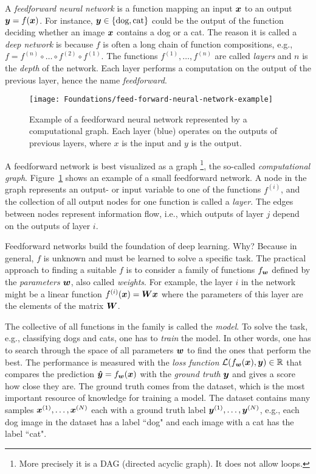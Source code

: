 		A \emph{feedforward neural network} is a function mapping an input $\bm{x}$ to an output $\bm{y} = f(\bm{x})$.
		For instance, $\bm{y} \in \{\text{dog}, \text{cat} \}$ could be the output of the function deciding whether an image $\bm{x}$ contains a dog or a cat. 
		The reason it is called a \emph{deep network} is because $f$ is often a long chain of function compositions, e.g., 
		$f = f^{(n)} \circ  \ldots  \circ f^{(2)} \circ f^{(1)}$.
		The functions $f^{(1)}, \dots, f^{(n)}$ are called \emph{layers} and $n$ is the \emph{depth} of the network.
		Each layer performs a computation on the output of the previous layer, hence the name \emph{feedforward}.
		\begin{figure}[t]
			\centering
			\texttt{[image: Foundations/feed-forward-neural-network-example]}
			\caption[Example of a feedforward neural network]
					{Example of a feedforward neural network represented by a computational graph. 
					 Each layer (blue) operates on the outputs of previous layers, where $x$ is the input and $y$ is the output.
					 \label{fig:example_feed_forward_network}}
		\end{figure}
		A feedforward network is best visualized as a graph%
		\footnote{More precisely it is a DAG (directed acyclic graph). It does not allow loops.}, 
		the so-called \emph{computational graph}.
		Figure~\ref{fig:example_feed_forward_network} shows an example of a small feedforward network.
		A node in the graph represents an output- or input variable to one of the functions $f^{(i)}$, and the collection of all output nodes for one function is called a \emph{layer}. 
		The edges between nodes represent information flow, i.e., which outputs of layer $j$ depend on the outputs of layer $i$.
		
		Feedforward networks build the foundation of deep learning.
		Why?
		Because in general, $f$ is unknown and must be learned to solve a specific task.
		The practical approach to finding a suitable $f$ is to consider a family of functions $f_{\bm{w}}$ defined by the \emph{parameters} $\bm{w}$, also called \emph{weights}.
		For example, the layer $i$ in the network might be a linear function $f_{}^{(i)}(\bm{x}) = \bm{W} \bm{x}$ where the parameters of this layer are the elements of the matrix $\bm{W}$.
		
		The collective of all functions in the family is called the \emph{model}.
		To solve the task, e.g., classifying dogs and cats, one has to \emph{train} the model.
		In other words, one has to search through the space of all parameters $\bm{w}$ to find the ones that perform the best.
		The performance is measured with the \emph{loss function} 
		$\mathcal{L}(f_{\bm{w}}(\bm{x}), \bm{y}) \in \mathbb{R}$ that compares the prediction 
		$\bm{\hat{y}} = f_{\bm{w}}(\bm{x})$ with the \emph{ground truth} $\bm{y}$ and gives a score how close they are.
		The ground truth comes from the dataset, which is the most important resource of knowledge for training a model.
		The dataset contains many samples $\bm{x}^{(1)}, \dots, \bm{x}^{(N)}$ each with a ground truth label 
		$\bm{y}^{(1)}, \dots, \bm{y}^{(N)}$, e.g., each dog image in the dataset has a label ``dog" and each image with a cat has the label ``cat".
		
